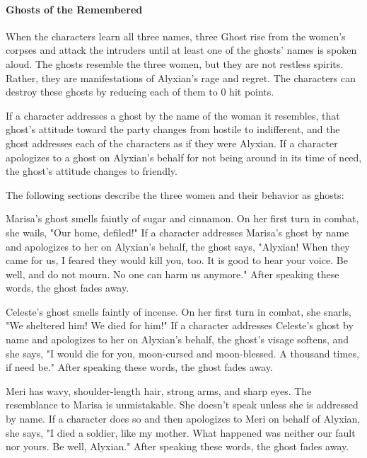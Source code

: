 \documentclass[10pt,a4paper,twoside,bg=print,twocolumn,openany,nodeprecatedcode]{dndbook}
\begin{document}
\paragraph{Ghosts of the Remembered}
When the characters learn all three names, three Ghost rise from the women's corpses and attack the intruders until at least one of the ghosts' names is spoken aloud. The ghosts resemble the three women, but they are not restless spirits. Rather, they are manifestations of Alyxian's rage and regret. The characters can destroy these ghosts by reducing each of them to 0 hit points.

If a character addresses a ghost by the name of the woman it resembles, that ghost's attitude toward the party changes from hostile to indifferent, and the ghost addresses each of the characters as if they were Alyxian. If a character apologizes to a ghost on Alyxian's behalf for not being around in its time of need, the ghost's attitude changes to friendly.

The following sections describe the three women and their behavior as ghosts:


\begin{description}[nolistsep]
\item[Marisa.]
Marisa's ghost smells faintly of sugar and cinnamon. On her first turn in combat, she wails, "Our home, defiled!" If a character addresses Marisa's ghost by name and apologizes to her on Alyxian's behalf, the ghost says, "Alyxian! When they came for us, I feared they would kill you, too. It is good to hear your voice. Be well, and do not mourn. No one can harm us anymore." After speaking these words, the ghost fades away.

\item[Celeste.]
Celeste's ghost smells faintly of incense. On her first turn in combat, she snarls, "We sheltered him! We died for him!" If a character addresses Celeste's ghost by name and apologizes to her on Alyxian's behalf, the ghost's visage softens, and she says, "I would die for you, moon-cursed and moon-blessed. A thousand times, if need be." After speaking these words, the ghost fades away.


\item[Meri.]
Meri has wavy, shoulder-length hair, strong arms, and sharp eyes. The resemblance to Marisa is unmistakable. She doesn't speak unless she is addressed by name. If a character does so and then apologizes to Meri on behalf of Alyxian, she says, "I died a soldier, like my mother. What happened was neither our fault nor yours. Be well, Alyxian." After speaking these words, the ghost fades away.
\end{description}
\end{document}
